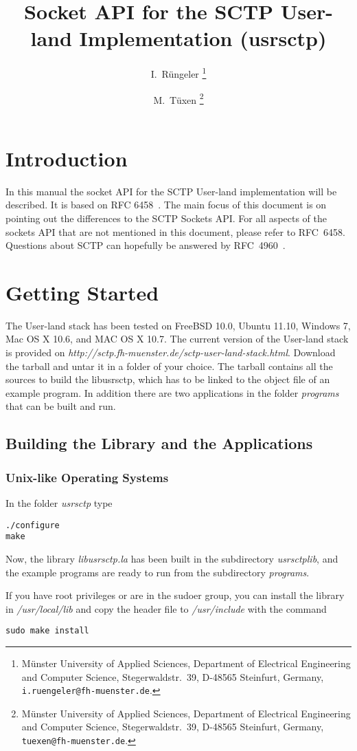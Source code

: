 \documentclass[a4paper]{article}
\title{Socket API for the SCTP User-land Implementation (usrsctp)}
\author{I.~R\"ungeler%
        \thanks{M\"unster University of Applied Sciences,
                Department of Electrical Engineering
                and Computer Science,
                Stegerwaldstr.~39,
                D-48565 Steinfurt,
                Germany,
                \texttt{i.ruengeler@fh-muenster.de}.}
        \and
        M.~T\"uxen%
        \thanks{M\"unster University of Applied Sciences,
                Department of Electrical Engineering
                and Computer Science,
                Stegerwaldstr.~39,
                D-48565 Steinfurt,
                Germany,
                \texttt{tuexen@fh-muenster.de}.}
}
\begin{document}
\setcounter{secnumdepth}{4}
\setcounter{tocdepth}{4}
\maketitle
\tableofcontents

\section{Introduction}
In this manual the socket API for the SCTP User-land implementation will be described. 
It is based on RFC 6458~\cite{socketAPI}. The main focus of this document is on pointing out
 the differences to the SCTP Sockets API. For all aspects of the sockets API that are not
 mentioned in this document, please refer to RFC~6458. Questions about SCTP can hopefully be
 answered by RFC~4960~\cite{SCTP}.
 
\section{Getting Started}
The User-land stack has been tested on FreeBSD 10.0, Ubuntu 11.10, Windows 7, Mac OS X 10.6, 
and MAC OS X 10.7.
The current version of the User-land stack is provided on \textit{http://sctp.fh-muenster.de/sctp-user-land-stack.html}.
Download the tarball and untar it in a folder of your choice. 
The tarball contains all the sources to build the libusrsctp, which has to be linked to the object file of an 
example program. In addition there are two applications in the folder \textit{programs} that can be built and run.
 
\subsection{Building the Library and the Applications}
\subsubsection{Unix-like Operating Systems}
In the folder \textit{usrsctp} type
\begin{verbatim}
./configure
make
\end{verbatim}
Now, the library \textit{libusrsctp.la} has been built in the subdirectory \textit{usrsctplib}, and the example 
programs are ready to run from the subdirectory \textit{programs}.

If you have root privileges or are in the sudoer group, you can install the library in \textit{/usr/local/lib} 
and copy the header file to \textit{/usr/include} with the command
\begin{verbatim}
sudo make install
\end{verbatim}
\end{document}
